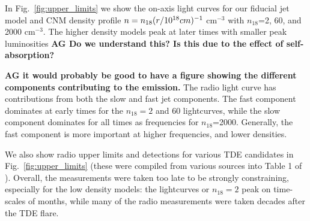 \documentclass[usenatbib,fleqn]{mnras}
\begin{document}
In Fig.~\ref{fig:upper_limits} we show the on-axis light curves for
our fiducial jet model and CNM density profile $n=n_{18} (r/10^{18}
{\rm} cm)^{-1}$ cm$^{-3}$ with $n_{18}$=2, 60, and 2000 cm$^{-3}$. The
higher density models peak at later times with smaller peak
luminosities {\bf AG Do we understand this? Is this due to the effect
  of self-absorption?}

{\bf AG it would probably be good to have a figure showing the
  different components contributing to the emission.} The radio light
curve has contributions from both the slow and fast jet
components. The fast component dominates at
early times for the $n_{18}=2$ and 60 lightcurves, while the slow
component dominates for all times as frequencies for
$n_{18}$=2000. Generally, the fast component is more important at
higher frequencies, and lower densities.

We also show radio upper limits and detections for various TDE
candidates in Fig.~\ref{fig:upper_limits} (these were compiled from
various sources into Table 1 of \citealt{Mimica+2015}). Overall, the
measurements were taken too late to be strongly constraining,
especially for the low density models: the lightcurves or $n_{18}=2$
peak on time-scales of months, while many of the radio measurements
were taken decades after the TDE flare.
\end{document}
